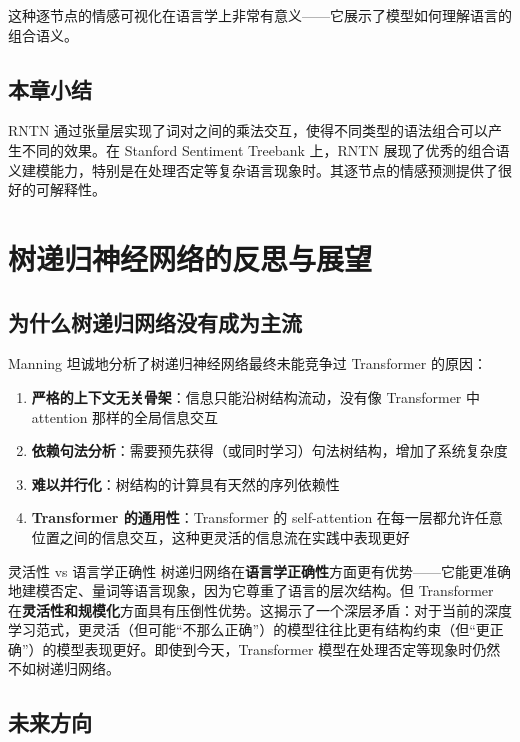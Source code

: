 \documentclass[a4paper]{article}
\begin{document}
这种逐节点的情感可视化在语言学上非常有意义——它展示了模型如何理解语言的组合语义。

\subsection{本章小结}

RNTN 通过张量层实现了词对之间的乘法交互，使得不同类型的语法组合可以产生不同的效果。在 Stanford Sentiment Treebank 上，RNTN 展现了优秀的组合语义建模能力，特别是在处理否定等复杂语言现象时。其逐节点的情感预测提供了很好的可解释性。


\section{树递归神经网络的反思与展望}

\subsection{为什么树递归网络没有成为主流}

Manning 坦诚地分析了树递归神经网络最终未能竞争过 Transformer 的原因：

\begin{enumerate}
    \item \textbf{严格的上下文无关骨架}：信息只能沿树结构流动，没有像 Transformer 中 attention 那样的全局信息交互
    \item \textbf{依赖句法分析}：需要预先获得（或同时学习）句法树结构，增加了系统复杂度
    \item \textbf{难以并行化}：树结构的计算具有天然的序列依赖性
    \item \textbf{Transformer 的通用性}：Transformer 的 self-attention 在每一层都允许任意位置之间的信息交互，这种更灵活的信息流在实践中表现更好
\end{enumerate}

\begin{warningbox}{灵活性 vs 语言学正确性}
树递归网络在\textbf{语言学正确性}方面更有优势——它能更准确地建模否定、量词等语言现象，因为它尊重了语言的层次结构。但 Transformer 在\textbf{灵活性和规模化}方面具有压倒性优势。这揭示了一个深层矛盾：对于当前的深度学习范式，更灵活（但可能``不那么正确''）的模型往往比更有结构约束（但``更正确''）的模型表现更好。即使到今天，Transformer 模型在处理否定等现象时仍然不如树递归网络。
\end{warningbox}

\subsection{未来方向}
\end{document}
